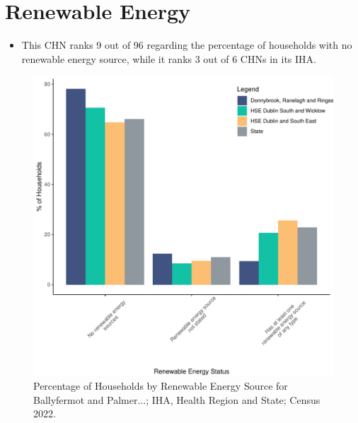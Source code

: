 \documentclass{article}
\begin{document}
\section{Renewable Energy}\label{sect:RE}
\begin{itemize}
\item This CHN ranks  9 out of 96 regarding the percentage of households with no renewable energy source, while it ranks   3 out of 6 CHNs in its IHA.
\end{itemize}
\begin{figure}[H]
	\centering
	\includegraphics[width = 140mm]{../figures/RenewableEnergyED.pdf}
	\caption{Percentage of Households by Renewable Energy Source for Ballyfermot and Palmer...; IHA, Health Region and State; Census 2022.}
	\label{fig:vbnv}
	\end{figure}
\end{document}
